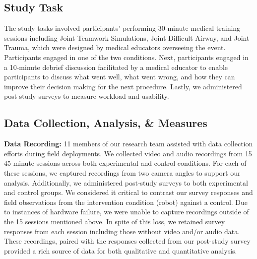 \subsection{Study Task} 

The study tasks involved participants’ performing 30-minute medical training sessions including Joint Teamwork Simulations, Joint Difficult Airway, and Joint Trauma, which were designed by medical educators overseeing the event.
Participants engaged in one of the two conditions.
Next, participants engaged in a 10-minute debrief discussion facilitated by a medical educator to enable participants to discuss what went well, what went wrong, and how they can improve their decision making for the next procedure.
Lastly, we administered post-study surveys to measure workload and usability.

\begin{comment}
\begin{figure}[t] 
	\centering 
	\texttt{[image: figures/nasa\_tlx\_comparison\_v7.png]} 
	\caption{Control and robot groups NASA-TLX \cite{hart2006nasa} scores.}%
	\label{fig:robot-sus-nasa} 
\end{figure}
\end{comment}

\subsection{Data Collection, Analysis, \& Measures} 

\textbf{Data Recording:} 11 members of our research team assisted with data collection efforts during field deployments. We collected video and audio recordings from 15 45-minute sessions across both experimental and control conditions. For each of these sessions, we captured recordings from two camera angles to support our analysis. Additionally, we administered post-study surveys to both experimental and control groups. We considered it critical to contrast our survey responses and field observations from the intervention condition (robot) against a control. Due to instances of hardware failure, we were unable to capture recordings outside of the 15 sessions mentioned above. In spite of this loss, we retained survey responses from each session including those without video and/or audio data. These recordings, paired with the responses collected from our post-study survey provided a rich source of data for both qualitative and quantitative analysis. 

